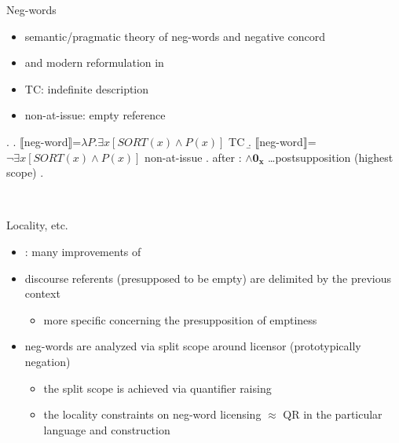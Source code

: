 \documentclass[
  ignorenonframetext,
]{beamer}
\providecommand{\tightlist}{%
  \setlength{\itemsep}{0pt}\setlength{\parskip}{0pt}}
\begin{document}
\begin{frame}
\begin{block}{Neg-words}
\protect\hypertarget{neg-words}{}
\begin{itemize}
\tightlist
\item
  semantic/pragmatic theory of neg-words and negative concord
\item
  \citet{ovalle2004double} and modern reformulation in
  \citet{kuhn2022dynamics}
\item
  TC: indefinite description
\item
  non-at-issue: empty reference
\end{itemize}

\ex. \a.
\(\llbracket\)neg-word\(\rrbracket\)=\(\lambda P.\exists x[SORT(x) \wedge P(x)]\)
\hfill TC \b.
\(\llbracket\)neg-word\(\rrbracket\)=\(\neg \exists x[SORT(x) \wedge P(x)]\)
\hfill non-at-issue \a. after \citet{kuhn2022dynamics}:
\(\wedge \mathbf{0_x}\) \ldots postsupposition (highest scope) \z.

~
\end{block}
\end{frame}

\begin{frame}
\begin{block}{Locality, etc.}
\protect\hypertarget{locality-etc.}{}
\begin{itemize}
\tightlist
\item
  \citet{kuhn2022dynamics}: many improvements of
  \citet{ovalle2004double}
\item
  discourse referents (presupposed to be empty) are delimited by the
  previous context

  \begin{itemize}
  \tightlist
  \item
    more specific concerning the presupposition of emptiness
  \end{itemize}
\item
  neg-words are analyzed via split scope around licensor (prototypically
  negation)

  \begin{itemize}
  \tightlist
  \item
    the split scope is achieved via quantifier raising
  \item
    the locality constraints on neg-word licensing \(\approx\) QR in the
    particular language and construction
  \end{itemize}
\end{itemize}
\end{block}
\end{frame}
\end{document}
